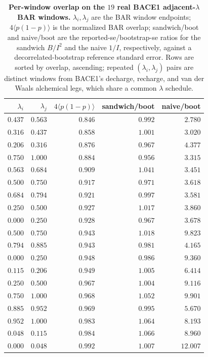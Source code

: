 \begin{table}[t]\centering
\caption{\textbf{Per-window overlap on the $19$ real BACE1 adjacent-$\lambda$ BAR windows.}
$\lambda_i,\lambda_j$
are the BAR window endpoints; $4\langle p(1-p)\rangle$ is the normalized BAR overlap;
sandwich/boot and naive/boot are the reported-se/bootstrap-se ratios for the sandwich $B/I^2$
and the naive $1/I$, respectively, against a decorrelated-bootstrap reference standard error.
Rows are sorted by overlap, ascending; repeated $(\lambda_i,\lambda_j)$ pairs are distinct
windows from BACE1's decharge, recharge, and van der Waals alchemical legs, which share a
common $\lambda$ schedule.}
\label{tab:bace1}
\small
\begin{tabular}{@{}rrrrr@{}}
\toprule
$\lambda_i$ & $\lambda_j$ & $4\langle p(1-p)\rangle$ & sandwich/boot & naive/boot \\
\midrule
$0.437$ & $0.563$ & $0.846$ & $0.992$ & $2.780$ \\
$0.316$ & $0.437$ & $0.858$ & $1.001$ & $3.020$ \\
$0.206$ & $0.316$ & $0.876$ & $0.967$ & $4.377$ \\
$0.750$ & $1.000$ & $0.884$ & $0.956$ & $3.315$ \\
$0.563$ & $0.684$ & $0.909$ & $1.041$ & $3.451$ \\
$0.500$ & $0.750$ & $0.917$ & $0.971$ & $3.618$ \\
$0.684$ & $0.794$ & $0.921$ & $0.997$ & $3.581$ \\
$0.250$ & $0.500$ & $0.927$ & $1.017$ & $3.860$ \\
$0.000$ & $0.250$ & $0.928$ & $0.967$ & $3.678$ \\
$0.500$ & $0.750$ & $0.943$ & $1.018$ & $9.823$ \\
$0.794$ & $0.885$ & $0.943$ & $0.981$ & $4.165$ \\
$0.000$ & $0.250$ & $0.948$ & $0.986$ & $9.360$ \\
$0.115$ & $0.206$ & $0.949$ & $1.005$ & $6.414$ \\
$0.250$ & $0.500$ & $0.967$ & $1.004$ & $9.116$ \\
$0.750$ & $1.000$ & $0.968$ & $1.052$ & $9.901$ \\
$0.885$ & $0.952$ & $0.969$ & $0.995$ & $5.670$ \\
$0.952$ & $1.000$ & $0.983$ & $1.064$ & $8.193$ \\
$0.048$ & $0.115$ & $0.984$ & $1.066$ & $8.960$ \\
$0.000$ & $0.048$ & $0.992$ & $1.007$ & $12.007$ \\
\bottomrule
\end{tabular}
\end{table}

